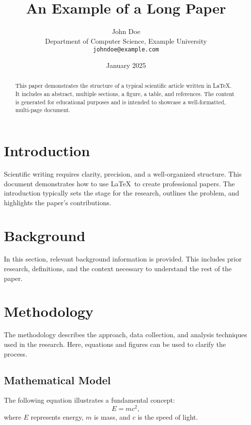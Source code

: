 \documentclass[twocolumn]{article}
\title{An Example of a Long Paper}
\author{John Doe \\
Department of Computer Science, Example University \\
\texttt{johndoe@example.com}}
\date{January 2025}
\begin{document}
    \maketitle

    \begin{abstract}
        This paper demonstrates the structure of a typical scientific article written in \LaTeX. It includes an abstract, multiple sections, a figure, a table, and references. The content is generated for educational purposes and is intended to showcase a well-formatted, multi-page document.
    \end{abstract}

    \section{Introduction}
    Scientific writing requires clarity, precision, and a well-organized structure. This document demonstrates how to use \LaTeX\ to create professional papers. The introduction typically sets the stage for the research, outlines the problem, and highlights the paper's contributions.

    \lipsum[1-2]

    \section{Background}
    In this section, relevant background information is provided. This includes prior research, definitions, and the context necessary to understand the rest of the paper.

    \lipsum[3-4]

    \section{Methodology}
    The methodology describes the approach, data collection, and analysis techniques used in the research. Here, equations and figures can be used to clarify the process.

    \subsection{Mathematical Model}
    The following equation illustrates a fundamental concept:
    \begin{equation}
        E = mc^2,
    \end{equation}
    where $E$ represents energy, $m$ is mass, and $c$ is the speed of light.
\end{document}
